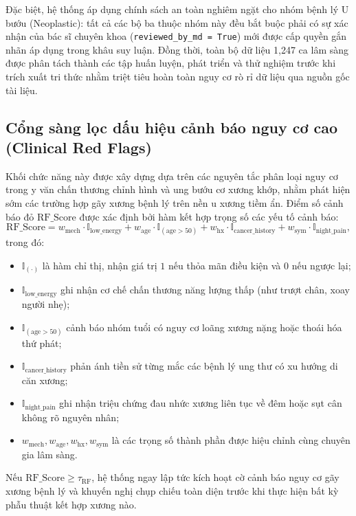 Đặc biệt, hệ thống áp dụng chính sách an toàn nghiêm ngặt cho nhóm bệnh lý U bướu (Neoplastic): tất cả các bộ ba thuộc nhóm này đều bắt buộc phải có sự xác nhận của bác sĩ chuyên khoa (\texttt{reviewed\_by\_md = True}) mới được cấp quyền gắn nhãn áp dụng trong khâu suy luận. Đồng thời, toàn bộ dữ liệu 1,247 ca lâm sàng được phân tách thành các tập huấn luyện, phát triển và thử nghiệm trước khi trích xuất tri thức nhằm triệt tiêu hoàn toàn nguy cơ rò rỉ dữ liệu qua nguồn gốc tài liệu.

\subsection{Cổng sàng lọc dấu hiệu cảnh báo nguy cơ cao (Clinical Red Flags)}
Khối chức năng này được xây dựng dựa trên các nguyên tắc phân loại nguy cơ trong y văn chấn thương chỉnh hình và ung bướu cơ xương khớp, nhằm phát hiện sớm các trường hợp gãy xương bệnh lý trên nền u xương tiềm ẩn. Điểm số cảnh báo đỏ $\mathrm{RF\_Score}$ được xác định bởi hàm kết hợp trọng số các yếu tố cảnh báo:
\begin{equation}
    \mathrm{RF\_Score} = w_{\mathrm{mech}} \cdot \mathbb{I}_{\mathrm{low\_energy}} + w_{\mathrm{age}} \cdot \mathbb{I}_{(\mathrm{age} > 50)} + w_{\mathrm{hx}} \cdot \mathbb{I}_{\mathrm{cancer\_history}} + w_{\mathrm{sym}} \cdot \mathbb{I}_{\mathrm{night\_pain}},
\end{equation}
trong đó:
\begin{itemize}
    \item $\mathbb{I}_{(\cdot)}$ là hàm chỉ thị, nhận giá trị $1$ nếu thỏa mãn điều kiện và $0$ nếu ngược lại;
    \item $\mathbb{I}_{\mathrm{low\_energy}}$ ghi nhận cơ chế chấn thương năng lượng thấp (như trượt chân, xoay người nhẹ);
    \item $\mathbb{I}_{(\mathrm{age} > 50)}$ cảnh báo nhóm tuổi có nguy cơ loãng xương nặng hoặc thoái hóa thứ phát;
    \item $\mathbb{I}_{\mathrm{cancer\_history}}$ phản ánh tiền sử từng mắc các bệnh lý ung thư có xu hướng di căn xương;
    \item $\mathbb{I}_{\mathrm{night\_pain}}$ ghi nhận triệu chứng đau nhức xương liên tục về đêm hoặc sụt cân không rõ nguyên nhân;
    \item $w_{\mathrm{mech}}, w_{\mathrm{age}}, w_{\mathrm{hx}}, w_{\mathrm{sym}}$ là các trọng số thành phần được hiệu chỉnh cùng chuyên gia lâm sàng.
\end{itemize}
Nếu $\mathrm{RF\_Score} \ge \tau_{\mathrm{RF}}$, hệ thống ngay lập tức kích hoạt cờ cảnh báo nguy cơ gãy xương bệnh lý và khuyến nghị chụp chiếu toàn diện trước khi thực hiện bất kỳ phẫu thuật kết hợp xương nào.

